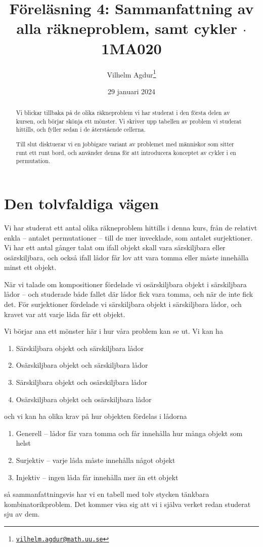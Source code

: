 \documentclass[nobib]{tufte-handout}
\title{Föreläsning 4: Sammanfattning av alla räkneproblem, samt cykler $\cdot$ 1MA020}
\author[Vilhelm Agdur]{Vilhelm Agdur\thanks{\href{mailto:vilhelm.agdur@math.uu.se}{\nolinkurl{vilhelm.agdur@math.uu.se}}}}
\date{29 januari 2024}
\begin{document}

\maketitle%

\begin{abstract}
\noindent
Vi blickar tillbaka på de olika räkneproblem vi har studerat i den första delen av kursen, och börjar skönja ett mönster. Vi skriver upp tabellen av problem vi studerat hittills, och fyller sedan i de återstående cellerna.

Till slut disktuerar vi en jobbigare variant av problemet med människor som sitter runt ett runt bord, och använder denna för att introducera konceptet av cykler i en permutation.
\end{abstract}

\section{Den tolvfaldiga vägen}

Vi har studerat ett antal olika räkneproblem hittills i denna kurs, från de relativt enkla -- antalet permutationer -- till de mer invecklade, som antalet surjektioner. Vi har ett antal gånger talat om ifall objekt skall vara särskiljbara eller osärskiljbara, och också ifall lådor får lov att vara tomma eller måste innehålla minst ett objekt.

När vi talade om kompositioner fördelade vi osärskiljbara objekt i särskiljbara lådor -- och studerade både fallet där lådor fick vara tomma, och när de inte fick det. För surjektioner fördelade vi särskiljbara objekt i särskiljbara lådor, och kravet var att varje låda får ett objekt.

Vi börjar ana ett mönster här i hur våra problem kan se ut. Vi kan ha
\begin{enumerate}
  \item Särskiljbara objekt och särskiljbara lådor
  \item Osärskiljbara objekt och särskiljbara lådor
  \item Särskiljbara objekt och osärskiljbara lådor
  \item Osärskiljbara objekt och osärskiljbara lådor
\end{enumerate}
och vi kan ha olika krav på hur objekten fördelas i lådorna
\begin{enumerate}
  \item Generell -- lådor får vara tomma och får innehålla hur många objekt som helst
  \item Surjektiv -- varje låda måste innehålla något objekt
  \item Injektiv -- ingen låda får innehålla mer än ett objekt
\end{enumerate}
så sammanfattningsvis har vi en tabell med tolv stycken tänkbara kombinatorikproblem. Det kommer visa sig att vi i själva verket redan studerat sju av dem.
\end{document}
